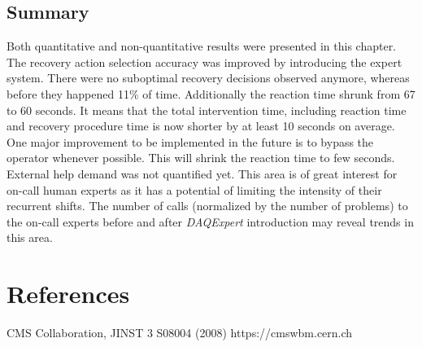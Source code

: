 \documentclass[a4paper]{jpconf}
\begin{document}
\subsection{Summary}
Both quantitative and non-quantitative results were presented in this chapter. The recovery action selection accuracy was improved by introducing the expert system. There were no suboptimal recovery decisions observed anymore, whereas before they happened 11\% of time. Additionally the reaction time shrunk from 67 to 60 seconds. It means that the total intervention time, including reaction time and recovery procedure time is now shorter by at least 10 seconds on average. One major improvement to be implemented in the future is to bypass the operator whenever possible. This will shrink the reaction time to few seconds.
External help demand was not quantified yet. This area is of great interest for on-call human experts as it has a potential of limiting the intensity of their recurrent shifts. The number of calls (normalized by the number of problems) to the on-call experts before and after {\it DAQExpert} introduction may reveal trends in this area.


\section*{References}
\begin{thebibliography}{9}

 CMS Collaboration, JINST 3 S08004 (2008)
 https://cmswbm.cern.ch
\end{thebibliography}
\end{document}
